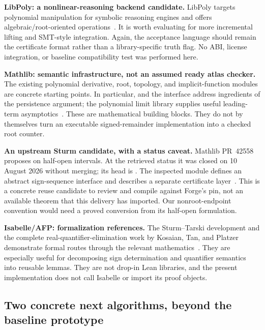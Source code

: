 \textbf{LibPoly: a nonlinear-reasoning backend candidate.} LibPoly targets polynomial manipulation for symbolic reasoning engines and offers algebraic/root-oriented operations~\cite{libpoly}. It is worth evaluating for more incremental lifting and SMT-style integration. Again, the acceptance language should remain the certificate format rather than a library-specific truth flag. No ABI, license integration, or baseline compatibility test was performed here.

\textbf{Mathlib: semantic infrastructure, not an assumed ready atlas checker.} The existing polynomial derivative, root, topology, and implicit-function modules are concrete starting points. In particular,  and the  interface address ingredients of the persistence argument; the polynomial limit library supplies useful leading-term asymptotics~\cite{mathlib-topology,mathlib-implicit,mathlib-limits}. These are mathematical building blocks. They do not by themselves turn an executable signed-remainder implementation into a checked root counter.

\textbf{An upstream Sturm candidate, with a status caveat.} Mathlib PR~42558 proposes  on half-open intervals. At the retrieved status it was closed on 10 August 2026 without merging; its head is . The inspected module defines an abstract sign-sequence interface and describes a separate certificate layer~\cite{lean-sturm-pr,lean-sturm-source}. This is a concrete reuse candidate to review and compile against Forge's pin, not an available theorem that this delivery has imported. Our nonroot-endpoint convention would need a proved conversion from its half-open formulation.

\textbf{Isabelle/AFP: formalization references.} The Sturm--Tarski development and the complete real-quantifier-elimination work by Kosaian, Tan, and Platzer demonstrate formal routes through the relevant mathematics~\cite{sturm-tarski,kosaian}. They are especially useful for decomposing sign determination and quantifier semantics into reusable lemmas. They are not drop-in Lean libraries, and the present implementation does not call Isabelle or import its proof objects.

\subsection{Two concrete next algorithms, beyond the baseline prototype}

